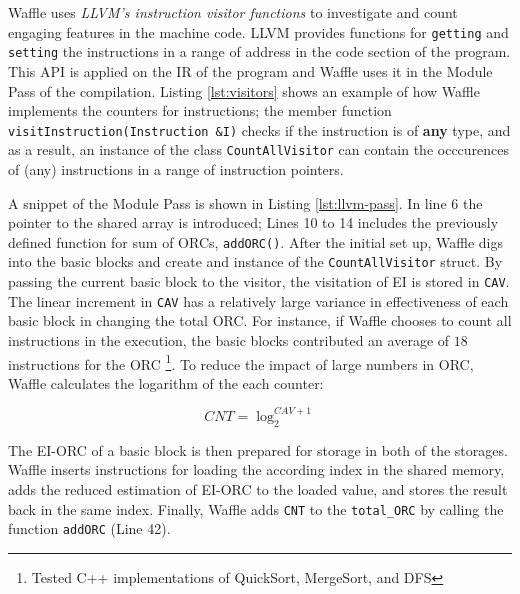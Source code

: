 
Waffle uses \textit{LLVM's instruction visitor functions} \cite{inst_visitor} to investigate and count engaging features in the machine code. LLVM provides functions for \texttt{getting} and \texttt{setting} the instructions in a range of address in the code section of the program. This API is applied on the IR of the program and Waffle uses it in the Module Pass of the compilation. Listing \ref{lst:visitors} shows an example of how Waffle implements the counters for instructions; the member function \texttt{visitInstruction(Instruction \&I)} checks if the instruction is of \textbf{any} type, and as a result, an instance of the class \texttt{CountAllVisitor} can contain the occcurences of (any) instructions in a range of instruction pointers.




A snippet of the Module Pass is shown in Listing \ref{lst:llvm-pass}. In line 6 the pointer to the shared array is introduced; Lines 10 to 14 includes the previously defined function for sum of ORCs, \texttt{addORC()}. After the initial set up, Waffle digs into the basic blocks and create and instance of the \texttt{CountAllVisitor} struct. By passing the current basic block to the visitor, the visitation of EI is stored in \texttt{CAV}. The linear increment in \texttt{CAV} has a relatively large variance in effectiveness of each basic block in changing the total ORC. For instance, if Waffle chooses to count all instructions in the execution, the basic blocks contributed an average of $18$ instructions for the ORC \footnote{Tested C++ implementations of QuickSort, MergeSort, and DFS}. To reduce the impact of large numbers in ORC, Waffle calculates the logarithm of the each counter: 

\begin{equation}
  \label{eq:log}
  CNT = \log_{2}^{CAV+1} 
\end{equation}

The EI-ORC of a basic block is then prepared for storage in both of the storages. Waffle inserts instructions for loading the according index in the shared memory, adds the reduced estimation of EI-ORC to the loaded value, and stores the result back in the same index. Finally, Waffle adds \texttt{CNT} to the \texttt{total\_ORC} by calling the function \texttt{addORC} (Line 42).

